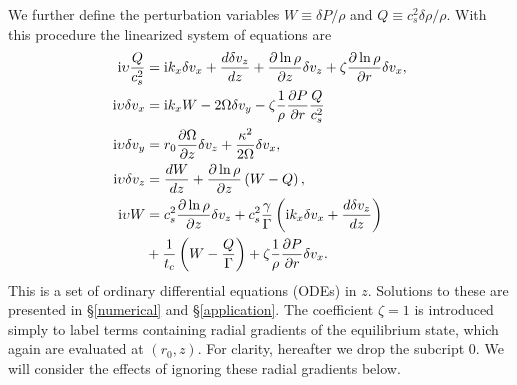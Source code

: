 We further define the perturbation variables  $W \equiv \delta P /\rho$ 
and $Q \equiv c_s^2\delta\rho/\rho$.  With this procedure the linearized
system of equations are
\begin{subequations}\label{lin_all}\begin{align}
  \mathrm{i}\upsilon \frac{Q}{c_s^2}  &=  \mathrm{i} k_x \delta v_x + \frac{d\delta
    v_z}{dz} + \frac{\partial\ln{\rho}}{\partial z}\delta v_z + \zeta
  \frac{\partial\ln{\rho}}{\partial r} \delta v_x,\label{lin_mass}\\
  \mathrm{i}\upsilon \delta v_x  &= \mathrm{i} k_x W - 2\Omega\delta v_y -
  \zeta\frac{1}{\rho}\frac{\partial P}{\partial r}\frac{Q}{c_s^2}\label{lin_vx}\\
   \mathrm{i} \upsilon\delta v_y &= r_0\frac{\partial \Omega}{\partial z}\delta v_z +
  \frac{\kappa^2}{2\Omega}\delta v_x, \label{lin_vy}\\
   \mathrm{i}\upsilon\delta v_z &= \frac{dW}{dz} +
  \frac{\partial\ln{\rho}}{\partial z}\left(W-Q\right), \label{lin_vz}\\
  \mathrm{i} \upsilon W &= c_s^2\frac{\partial\ln{\rho}}{\partial z}\delta v_z +
  c_s^2\frac{\gamma}{\Gamma} \left(\mathrm{i} k_x\delta v_x + \frac{d\delta
      v_z}{dz}\right) \notag\\
  &+ \frac{1}{t_c}\left(W - \frac{Q}{\Gamma}\right) +
  \zeta\frac{1}{\rho}\frac{\partial P}{\partial r}\delta v_x.\label{lin_energy}
\end{align}\end{subequations}
This is a set of ordinary differential equations (ODEs) in
$z$.  %
Solutions to these 
are presented in \S\ref{numerical} and \S\ref{application}.   The coefficient $ \zeta = 1$ is 
introduced simply to label terms containing radial gradients of the equilibrium state, 
which again are evaluated at $(r_0, z)$. For clarity, hereafter we drop the subcript $0$.    
We will consider the effects of ignoring these radial gradients below. 



